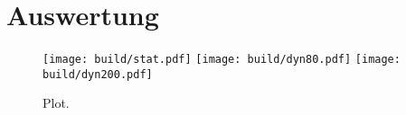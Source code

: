 \section{Auswertung}
\label{sec:Auswertung}

\begin{figure}
  \centering
  \texttt{[image: build/stat.pdf]}
  \texttt{[image: build/dyn80.pdf]}
  \texttt{[image: build/dyn200.pdf]}
  \caption{Plot.}
  \label{fig:plot}
\end{figure}
